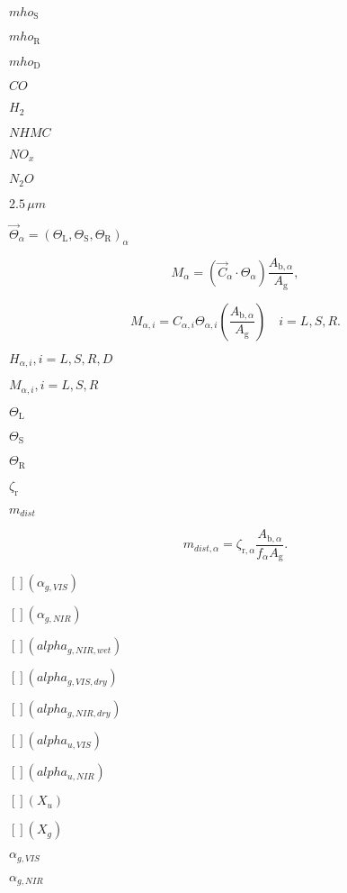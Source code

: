 \documentclass{article}
\begin{document}
$mho_{\mathrm{S}}$
\pagebreak

$mho_{\mathrm{R}}$
\pagebreak

$mho_{\mathrm{D}}$
\pagebreak

$CO$
\pagebreak

$H_2$
\pagebreak

$NHMC$
\pagebreak

$NO_x$
\pagebreak

$N_2O$
\pagebreak

$2.5\, \mu m$
\pagebreak

$\vec{\Theta}_{\alpha} = (\Theta_\mathrm{L}, \Theta_\mathrm{S}, \Theta_\mathrm{R})_\alpha$
\pagebreak

\[ \label{eqn_using_mort_factors} {M_{\alpha}}= (\vec{C}_\alpha \cdot \Theta_{\alpha} ) \frac{A_{\mathrm{b},\alpha}}{A_\mathrm{g}}, \]
\pagebreak

\[ \label{eqn_using_mort_factors_individual} M_{\alpha, i}= C_{\alpha, i} \Theta_{\alpha, i} \left(\frac{A_{\mathrm{b},\alpha}}{A_\mathrm{g}} \right) \quad i={L, S, R}. \]
\pagebreak

$H_{\alpha, i}, i={L, S, R, D}$
\pagebreak

$M_{\alpha, i}, i={L, S, R}$
\pagebreak

$\Theta_\mathrm{L}$
\pagebreak

$\Theta_{\mathrm{S}}$
\pagebreak

$\Theta_\mathrm{R}$
\pagebreak

$\zeta_\mathrm{r}$
\pagebreak

$m_{dist}$
\pagebreak

\[ \label{m_dist} m_{dist,\alpha} = \zeta_{\mathrm{r},\alpha} \frac{A_{\mathrm{b},\alpha}}{f_\alpha A_\mathrm{g}}. \]
\pagebreak

$[ ] (\alpha_{g,VIS})$
\pagebreak

$[ ] (\alpha_{g,NIR})$
\pagebreak

$[ ] (alpha_{g,NIR,wet})$
\pagebreak

$[ ] (alpha_{g,VIS,dry})$
\pagebreak

$[ ] (alpha_{g,NIR,dry})$
\pagebreak

$[ ] (alpha_{u,VIS})$
\pagebreak

$[ ] (alpha_{u,NIR})$
\pagebreak

$[ ] (X_u)$
\pagebreak

$[ ] (X_g)$
\pagebreak

$\alpha_{g,VIS}$
\pagebreak

$\alpha_{g,NIR}$
\pagebreak
\end{document}
